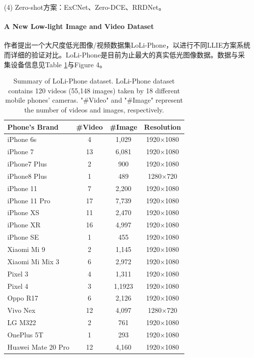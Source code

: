 \documentclass[letterpaper,12pt]{article}
\begin{document}
	(4)	Zero-shot方案：ExCNet、Zero-DCE、RRDNet。
	
	
	\paragraph{A New Low-light Image and Video Dataset} \qquad
	
	作者提出一个大尺度低光图像/视频数据集LoLi-Phone，以进行不同LLIE方案系统而详细的验证对比。LoLi-Phone是目前为止最大的真实低光图像数据。数据与采集设备信息见Table \ref{tab: LoLi-Phone dataset}与Figure 4。
	
		\begin{table}[!htbp]
		\centering
		\tiny
			\begin{tabular}{>{\centering\arraybackslash}m{2.5cm}|c|c|c}
				
				\hline
				
				\textbf{Phone's Brand} & \textbf{\#Video} & \textbf{\#Image} & \textbf{Resolution} \\
				
				\hline
				
				iPhone 6s   		& 4 & 1,029	& 1920×1080 \\
				iPhone 7 	 		& 13& 6,081 & 1920×1080 \\
				iPhone7 Plus		& 2 & 900   & 1920×1080 \\
				iPhone8 Plus 		& 1 & 489   & 1280×720  \\
				iPhone 11   		& 7 & 2,200 & 1920×1080 \\
				iPhone 11 Pro 		& 17& 7,739 & 1920×1080 \\
				iPhone XS 	 		& 11& 2,470 & 1920×1080 \\
				iPhone XR 			& 16& 4,997 & 1920×1080 \\
				iPhone SE 			& 1 & 455   & 1920×1080 \\
				Xiaomi Mi 9	 		& 2 & 1,145 & 1920×1080 \\
				Xiaomi Mi Mix 3     & 6 & 2,972 & 1920×1080 \\
				Pixel 3   			& 4 & 1,311 & 1920×1080 \\
				Pixel 4   			& 3 & 1,1923& 1920×1080 \\
				Oppo R17 			& 6 & 2,126 & 1920×1080 \\
				Vivo Nex 	 		& 12& 4,097 & 1280×720  \\
				LG M322      		& 2 & 761   & 1920×1080 \\
				OnePlus 5T   		& 1 & 293   & 1920×1080 \\
				Huawei Mate 20 Pro 	& 12& 4,160 & 1920×1080 \\
				
				\hline
				
			\end{tabular}
		\captionsetup{font=scriptsize} %
		\caption{\label{tab: LoLi-Phone dataset}
			Summary of LoLi-Phone dataset. LoLi-Phone dataset contains 120 videos (55,148 images) taken by 18 different mobile phones' cameras. "\#Video" and "\#Image" represent the number of videos and images, respectively.} %
		
	\end{table}
	
\end{document}

